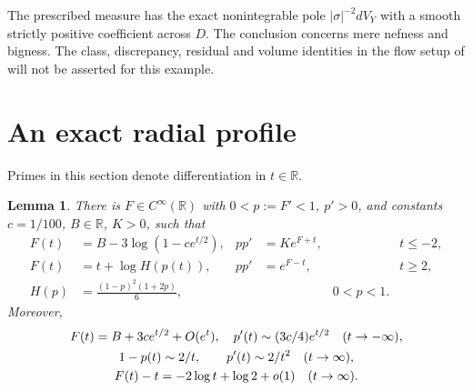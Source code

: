 \documentclass[11pt]{article}
\newtheorem{lemma}[theorem]{Lemma}
\begin{document}
The prescribed measure has the exact nonintegrable pole
$|\sigma|^{-2}dV_Y$ with a smooth strictly positive coefficient across
$D$. The conclusion concerns mere nefness and bigness. The class,
discrepancy, residual and volume identities in the flow setup of
\cite{DGL} will not be asserted for this example.

\section{An exact radial profile}
Primes in this section denote differentiation in $t\in\mathbb R$.
\begin{lemma}\label{lem:profile}
There is $F\in C^\infty(\mathbb R)$ with $0<p:=F'<1$, $p'>0$,
and constants $c=1/100$, $B\in\mathbb R$, $K>0$, such that
\begin{align}
 F(t)&=B-3\log(1-ce^{t/2}),&
 pp'&=Ke^{F+t},&& t\leq-2,\label{eq:left}\\
 F(t)&=t+\log H(p(t)),&
 pp'&=e^{F-t},&& t\geq2,\label{eq:right}\\
 H(p)&=\frac{(1-p)^2(1+2p)}6,&&&0<p<1.
\end{align}
Moreover,
\begin{gather}
 F(t)=B+3ce^{t/2}+O(e^t),\quad
 p'(t)\sim(3c/4)e^{t/2}\quad(t\to-\infty),\label{eq:left-asymptotic}\\
 1-p(t)\sim2/t,\qquad p'(t)\sim2/t^2\quad(t\to\infty),\notag\\
 F(t)-t=-2\log t+\log2+o(1)\quad(t\to\infty).\label{eq:right-asymptotic}
\end{gather}
\end{lemma}
\end{document}
